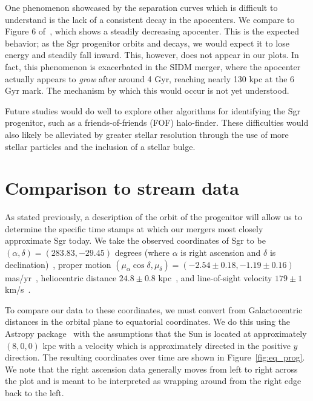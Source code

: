 One phenomenon showcased by the separation curves which is difficult to
understand is the lack of a consistent decay in the apocenters.  We compare to
Figure 6 of~\cite{dierickx_predicted_2017}, which shows a steadily decreasing
apocenter.  This is the expected behavior; as the Sgr progenitor orbits and
decays, we would expect it to lose energy and steadily fall inward.  This,
however, does not appear in our plots.  In fact, this phenomenon is
exacerbated in the SIDM merger, where the apocenter actually appears to
\textit{grow} after around 4 Gyr, reaching nearly 130 kpc at the 6 Gyr mark.
The mechanism by which this would occur is not yet understood.

Future studies would do well to explore other algorithms for identifying the Sgr
progenitor, such as a friends-of-friends (FOF) halo-finder. These difficulties
would also likely be alleviated by greater stellar resolution through the use of
more stellar particles and the inclusion of a stellar bulge. 


\hypertarget{comparison-to-stream-data}{%
\section{Comparison to stream data}\label{comparison-to-stream-data}}

As stated previously, a description of the orbit of the progenitor will allow us
to determine the specific time stamps at which our mergers most closely
approximate Sgr today.  We take the observed coordinates of Sgr to be
$(\alpha, \delta) = (283.83, -29.45)$ degrees (where $\alpha$ is right
ascension and $\delta$ is declination)~\cite{nasa_nasaipac_nodate}, proper
motion $(\mu_\alpha \cos\delta, \mu_\delta) = (-2.54 \pm 0.18, -1.19 \pm
0.16)$ mas/yr~\cite{massari_hubble_2013}, heliocentric distance $24.8 \pm 0.8$
kpc~\cite{kunder_distance_2009}, and line-of-sight velocity $179 \pm 1$
km/s~\cite{dierickx_predicted_2017,bellazzini_nucleus_2008}.  

To compare our data to these coordinates, we must convert from Galactocentric
distances in the orbital plane to equatorial coordinates.  We do this using the
Astropy package~\cite{astropy_collaboration_astropy_2013,
astropy_collaboration_astropy_2018} with the assumptions that the Sun is
located at approximately $(8,0,0)$ kpc with a velocity which is approximately
directed in the positive $y$ direction.  The resulting coordinates over time
are shown in Figure~\ref{fig:eq_prog}.  We note that the right ascension data
generally moves from left to right across the plot and is meant to be
interpreted as wrapping around from the right edge back to the left.

